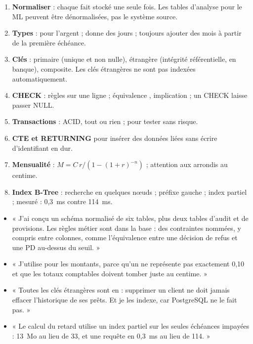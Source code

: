 \begin{resume}
\begin{enumerate}
\item \textbf{Normaliser} : chaque fait stocké une seule fois. Les tables d'analyse pour le ML peuvent
être dénormalisées, pas le système source.
\item \textbf{Types} :  pour l'argent ;  donne des jours ; toujours
ajouter des mois à partir de la première échéance.
\item \textbf{Clés} : primaire (unique et non nulle), étrangère (intégrité référentielle, 
en banque),  composite. Les clés étrangères ne sont pas indexées automatiquement.
\item \textbf{CHECK} : règles sur une ligne ; équivalence , implication  ;
un CHECK laisse passer NULL.
\item \textbf{Transactions} : ACID, tout ou rien ;  pour tester sans risque.
\item \textbf{CTE et RETURNING} pour insérer des données liées sans écrire d'identifiant en dur.
\item \textbf{Mensualité} : $M = C\,r / (1 - (1+r)^{-n})$ ; attention aux arrondis au centime.
\item \textbf{Index B-Tree} : recherche en quelques nœuds ; préfixe gauche ; index partiel ; mesuré :
0,3~ms contre 114~ms.
\end{enumerate}
\end{resume}

\begin{entretien}
\begin{itemize}
\item « J'ai conçu un schéma normalisé de six tables, plus deux tables d'audit et de provisions. Les
règles métier sont dans la base : des contraintes  nommées, y compris entre colonnes, comme
l'équivalence entre une décision de refus et une PD au-dessus du seuil. »
\item « J'utilise  pour les montants, parce qu'un  ne représente pas
exactement 0,10 et que les totaux comptables doivent tomber juste au centime. »
\item « Toutes les clés étrangères sont en  : supprimer un client ne doit
jamais effacer l'historique de ses prêts. Et je les indexe, car PostgreSQL ne le fait pas. »
\item « Le calcul du retard utilise un index partiel sur les seules échéances impayées : 13~Mo au lieu
de 33, et une requête en 0,3~ms au lieu de 114. »
\end{itemize}
\end{entretien}

